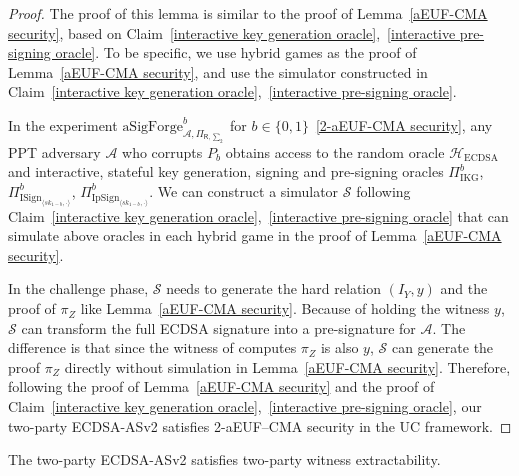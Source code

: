 \documentclass{llncs}
\begin{document}
\begin{proof}
The proof of this lemma is similar to the proof of Lemma~\ref{aEUF-CMA security}, based on Claim~\ref{interactive key generation oracle},~\ref{interactive pre-signing oracle}. To be specific, we use hybrid games as the proof of Lemma~\ref{aEUF-CMA security}, and use the simulator constructed in Claim~\ref{interactive key generation oracle},~\ref{interactive pre-signing oracle}. 

In the experiment $\text{aSigForge}^b_{\mathcal{A},\Pi_{\mathsf{R},\sum_2}}$ for $b\in\{0,1\}$~\ref{2-aEUF-CMA security}, any PPT adversary $\mathcal{A}$ who corrupts $P_b$ obtains access to the random oracle $\mathcal{H}_{\text{ECDSA}}$ and interactive, stateful key generation, signing and pre-signing oracles $\Pi^b_{\text{IKG}}$, $\Pi^b_{\text{ISign}_{\langle sk_{1-b},\cdot \rangle}}$, $\Pi^b_{\text{IpSign}_{\langle sk_{1-b},\cdot \rangle}}$. We can construct a simulator $\mathcal{S}$ following Claim~\ref{interactive key generation oracle},~\ref{interactive pre-signing oracle} that can simulate above oracles in each hybrid game in the proof of Lemma~\ref{aEUF-CMA security}. 

In the challenge phase, $\mathcal{S}$ needs to generate the hard relation $(I_Y,y)$ and the proof of $\pi_Z$ like Lemma~\ref{aEUF-CMA security}. Because of holding the witness $y$, $\mathcal{S}$ can transform the full ECDSA signature into a pre-signature for $\mathcal{A}$. The difference is that since the witness of computes $\pi_Z$ is also $y$, $\mathcal{S}$ can generate the proof $\pi_Z$ directly without simulation in Lemma~\ref{aEUF-CMA security}. Therefore, following the proof of Lemma~\ref{aEUF-CMA security} and the proof of Claim~\ref{interactive key generation oracle},~\ref{interactive pre-signing oracle}, our two-party ECDSA-ASv2 satisfies 2-aEUF–CMA security in the UC framework.
 
\end{proof}

\begin{lemma}
The two-party ECDSA-ASv2 satisfies two-party witness extractability.
\end{lemma}
\end{document}
